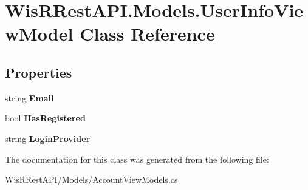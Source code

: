 \hypertarget{class_wis_r_rest_a_p_i_1_1_models_1_1_user_info_view_model}{}\section{Wis\+R\+Rest\+A\+P\+I.\+Models.\+User\+Info\+View\+Model Class Reference}
\label{class_wis_r_rest_a_p_i_1_1_models_1_1_user_info_view_model}
\subsection*{Properties}
\begin{DoxyCompactItemize}
\item 
\hypertarget{class_wis_r_rest_a_p_i_1_1_models_1_1_user_info_view_model_a4e95044d2ca034e59f64f397b1de3525}{}string {\bfseries Email}\label{class_wis_r_rest_a_p_i_1_1_models_1_1_user_info_view_model_a4e95044d2ca034e59f64f397b1de3525}

\item 
\hypertarget{class_wis_r_rest_a_p_i_1_1_models_1_1_user_info_view_model_a6e42ac8140b99f246a0c420e75685f81}{}bool {\bfseries Has\+Registered}\label{class_wis_r_rest_a_p_i_1_1_models_1_1_user_info_view_model_a6e42ac8140b99f246a0c420e75685f81}

\item 
\hypertarget{class_wis_r_rest_a_p_i_1_1_models_1_1_user_info_view_model_aa964b1d606b010e3f60deff056568144}{}string {\bfseries Login\+Provider}\label{class_wis_r_rest_a_p_i_1_1_models_1_1_user_info_view_model_aa964b1d606b010e3f60deff056568144}

\end{DoxyCompactItemize}


The documentation for this class was generated from the following file\+:\begin{DoxyCompactItemize}
\item 
Wis\+R\+Rest\+A\+P\+I/\+Models/Account\+View\+Models.\+cs\end{DoxyCompactItemize}
